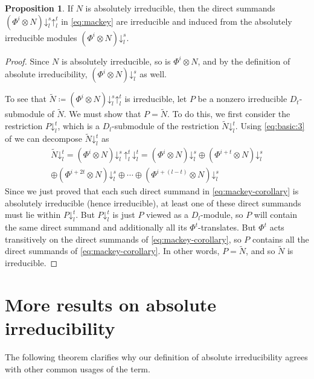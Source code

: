\documentclass[11pt,reqno]{amsart}
\theoremstyle{definition}
\newtheorem{proposition}[theorem]{Proposition}
\newcommand{\pda}{\mathord{\downarrow}}
\newcommand{\pua}{\mathord{\uparrow}}
\begin{document}
\begin{proposition}
\label{prop:mackey}
    If $N$ is absolutely irreducible, 
    then the direct summands 
    $( \Phi^{i}\otimes N)\pda^{s}_{l}\pua^{t}_{l}$
    in \eqref{eq:mackey} are irreducible and induced from the absolutely irreducible modules 
    $(\Phi^{i}\otimes N)\pda^{s}_{l}$.
\end{proposition}
\begin{proof}
    Since $N$ is absolutely irreducible, so is $\Phi^{i}\otimes N$, and by the definition of absolute irreducibility, $(\Phi^{i}\otimes N)\pda^{s}_{l}$ as well. 
    
    To see that $\tilde{N}\coloneqq (\Phi^{i}\otimes N)\pda^{s}_{l}\pua^{t}_{l}$ is irreducible, let $P$ be a nonzero irreducible $D_t$-submodule of $\tilde{N}$. We must show that $P=\tilde N$. To do this, we first consider the restriction $P\pda^t_l$, which is a $D_l$-submodule of the restriction $\tilde{N}\pda^t_l$. Using \eqref{eq:basic:3} of  we can decompose $\tilde{N}\pda^t_l$ as
    \begin{multline}\label{eq:mackey-corollary}
    \tilde{N}\pda^t_l=(\Phi^{i}\otimes N)\pda^{s}_{l}\,\pua^{t}_{l}\,\pda^t_l
    = 
    (\Phi^{i}\otimes N)\pda^{s}_{l}
    \oplus
    (\Phi^{i+t}\otimes N)\pda^{s}_{l}\\
    \oplus
    (\Phi^{i+2t}\otimes N)\pda^{s}_{l}
    \oplus\cdots\oplus
    (\Phi^{i+(l-t)}\otimes N)\pda^{s}_{l}
    \end{multline}
    Since we just proved that each such direct summand in \eqref{eq:mackey-corollary} is absolutely irreducible (hence irreducible), at least one of these direct summands must lie within $P\pda^t_l$. But $P\pda^t_l$ is just $P$ viewed as a $D_l$-module, so $P$ will contain the same direct summand and additionally all its $\Phi^t$-translates. But $\Phi^t$ acts transitively on the direct summands of \eqref{eq:mackey-corollary}, so $P$ contains all the direct summands of \eqref{eq:mackey-corollary}. In other words, $P=\tilde{N}$, and so $\tilde{N}$ is irreducible.
\end{proof}

\section{More results on absolute irreducibility}
\label{appendix:absolute irreducibility}

The following theorem clarifies why our definition of absolute irreducibility agrees with other common usages of the term.
\end{document}
